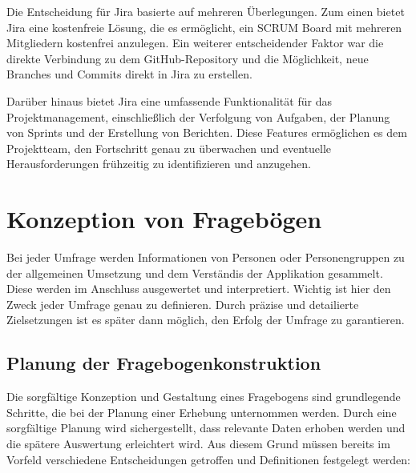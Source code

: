 Die Entscheidung für Jira basierte auf mehreren Überlegungen. Zum einen bietet Jira eine kostenfreie Lösung, die es ermöglicht,
ein SCRUM Board mit mehreren Mitgliedern kostenfrei anzulegen. Ein weiterer entscheidender Faktor war die direkte Verbindung
zu dem GitHub-Repository und die Möglichkeit, neue Branches und Commits direkt in Jira zu erstellen.

Darüber hinaus bietet Jira eine umfassende Funktionalität für das Projektmanagement, einschließlich der Verfolgung von
Aufgaben, der Planung von Sprints und der Erstellung von Berichten. Diese Features ermöglichen es dem Projektteam, den
Fortschritt genau zu überwachen und eventuelle Herausforderungen frühzeitig zu identifizieren und anzugehen.

\section{Konzeption von Fragebögen}
Bei jeder Umfrage werden Informationen von Personen oder Personengruppen zu der allgemeinen
Umsetzung und dem Verständis der Applikation gesammelt. Diese werden im Anschluss ausgewertet und
interpretiert. Wichtig ist hier den Zweck jeder Umfrage genau zu definieren. Durch präzise und
detailierte Zielsetzungen ist es später dann möglich, den Erfolg der Umfrage zu garantieren.

\subsection{Planung der Fragebogenkonstruktion}

Die sorgfältige Konzeption und Gestaltung eines Fragebogens sind grundlegende Schritte, die bei der Planung einer Erhebung unternommen werden.
Durch eine sorgfältige Planung wird sichergestellt, dass relevante Daten erhoben werden und die spätere Auswertung erleichtert wird.
Aus diesem Grund müssen bereits im Vorfeld verschiedene Entscheidungen getroffen und Definitionen festgelegt werden:

